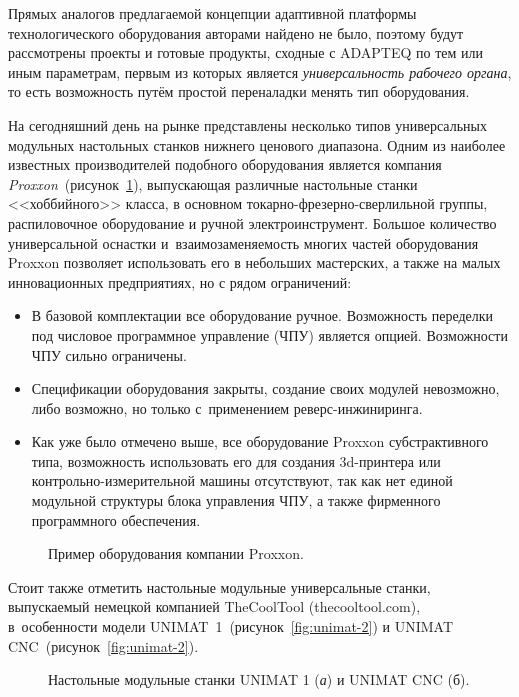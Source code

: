 Прямых аналогов предлагаемой концепции адаптивной платформы технологического оборудования авторами найдено не было, поэтому будут рассмотрены проекты и готовые продукты, сходные с ADAPTEQ по тем или иным параметрам, первым из которых является \textit{универсальность рабочего органа}, то есть возможность путём простой переналадки менять тип оборудования. 

На сегодняшний день на рынке представлены несколько типов универсальных модульных настольных станков нижнего ценового диапазона. Одним из наиболее известных производителей подобного оборудования является компания \textit{Proxxon}~(рисунок~\cref{fig:proxxon}), выпускающая различные настольные станки <<хоббийного>> класса, в основном токарно-фрезерно-сверлильной группы, распиловочное оборудование и ручной электроинструмент. Большое количество универсальной оснастки и~взаимозаменяемость многих частей оборудования Proxxon позволяет использовать его в небольших мастерских, а также на малых инновационных предприятиях, но с рядом ограничений:

\begin{itemize}
	\item В базовой комплектации все оборудование ручное. Возможность переделки под числовое программное управление (ЧПУ) является опцией. Возможности ЧПУ сильно ограничены.
	
	\item Спецификации оборудования закрыты, создание своих модулей невозможно, либо возможно, но только с~применением реверс-инжиниринга.
	
	\item Как уже было отмечено выше, все оборудование Proxxon субстрактивного типа, возможность использовать его для создания 3d-принтера или контрольно-измерительной машины отсутствуют, так как нет единой модульной структуры блока управления ЧПУ, а также фирменного программного обеспечения.	
\end{itemize}

\begin{figure}[ht]
	\caption{Пример оборудования компании Proxxon.}\label{fig:proxxon}
\end{figure}

Стоит также отметить настольные модульные универсальные станки, выпускаемый немецкой компанией TheCoolTool (thecooltool.com), в~особенности модели UNIMAT~1~(рисунок~\cref{fig:unimat-2}) и UNIMAT CNC~(рисунок~\cref{fig:unimat-2}).

\begin{figure}[ht]
	\caption{Настольные модульные станки UNIMAT 1 (\textit{а}) и UNIMAT CNC (б).}\label{fig:unimat}
\end{figure}

